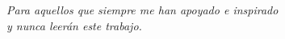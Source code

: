 \documentclass[\main/Main.tex]{subfiles}
\begin{document}
\begin{titlepage}
	\nonumber
	\null{}
	\begin{flushright}
		\textit{
			Para aquellos que siempre me han apoyado e inspirado\\y nunca leerán este trabajo.
			}\\[5mm]
	\end{flushright}
	\null
\end{titlepage}
\end{document}

